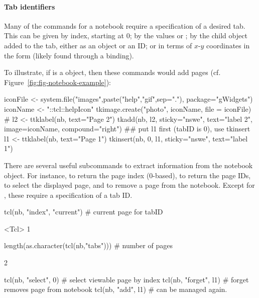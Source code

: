 \paragraph{Tab identifiers} %
Many of the commands for a notebook require a specification of a
desired tab. This can be given by index, starting at 0; by the values
 or ; by the child object added to the
tab, either as an \R\/ object or an ID; or in terms of $x$-$y$
coordinates in the form  (likely found through a
binding).

To illustrate, if  is a  object, then these
commands would add pages (cf. Figure~\ref{fig:fig-notebook-example}):
\begin{Schunk}
\begin{Sinput}
 iconFile <- system.file("images",paste("help","gif",sep="."),
                         package="gWidgets")
 iconName <- "::tcl::helpIcon"
 tkimage.create("photo", iconName, file = iconFile)
 #
 l2 <- ttklabel(nb, text="Page 2")
 tkadd(nb, l2, sticky="nswe", text="label 2", 
     image=iconName, compound="right")
 ## put l1 first (tabID is 0), use tkinsert
 l1 <- ttklabel(nb, text="Page 1")
 tkinsert(nb, 0, l1, sticky="nswe", text="label 1")
\end{Sinput}
\end{Schunk}
%
There are several useful subcommands to extract information from the
notebook object.  For instance,  to return the page index
(0-based),  to return the page IDs,  to select
the displayed page, and  to remove a page from the
notebook. Except for , these require a specification of a
tab ID.
\begin{Schunk}
\begin{Sinput}
 tcl(nb, "index", "current")           # current page for tabID
\end{Sinput}
\begin{Soutput}
<Tcl> 1 
\end{Soutput}
\begin{Sinput}
 length(as.character(tcl(nb,"tabs")))  # number of pages
\end{Sinput}
\begin{Soutput}
[1] 2
\end{Soutput}
\begin{Sinput}
 tcl(nb, "select", 0)                  # select viewable page by index
 tcl(nb, "forget", l1)                 # forget removes page from notebook
 tcl(nb, "add", l1)                    # can be managed again.
\end{Sinput}
\end{Schunk}
%

